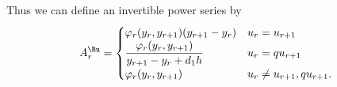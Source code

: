 Thus we can define an invertible power series by \[A^{\Bu}_{r}=
\begin{cases}
 \displaystyle
\varphi_r(y_r,y_{r+1})(y_{r+1} -y_r)
& u_r =u_{r+1}\\
 \displaystyle \frac{\varphi_r(y_r,y_{r+1})}{y_{r+1}-y_r+d_1h}&
 u_r=qu_{r+1}\\
 \displaystyle \varphi_r(y_r,y_{r+1})&
 u_r\neq u_{r+1}, qu_{r+1}.
\end{cases}
\]

